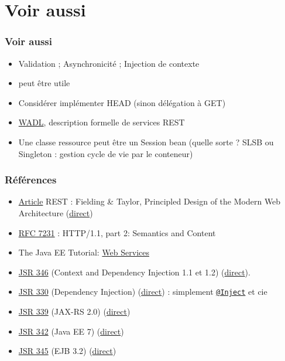 \documentclass[english, french]{beamer}
\begin{document}
\section{Voir aussi}
\begin{frame}
	\frametitle{Voir aussi}
	\begin{itemize}
		\item Validation ; Asynchronicité ; Injection de contexte%
		\item {} peut être utile
		\item Considérer implémenter HEAD (sinon délégation à GET)
		\item \href{http://www.w3.org/Submission/wadl/}{WADL}, description formelle de services REST
		\item Une classe ressource peut être un Session bean (quelle sorte ? \pause SLSB ou Singleton : gestion cycle de vie par le conteneur)
	\end{itemize}
\end{frame}

\begin{frame}
	\frametitle{Références}
	\begin{itemize}
		\item \href{http://doi.org/10.1145/337180.337228}{Article} REST : Fielding \& Taylor, Principled Design of the Modern Web Architecture (\href{https://www.ics.uci.edu/~fielding/pubs/webarch_icse2000.pdf}{direct})%
		\item \href{http://www.w3.org/Protocols/}{RFC 7231} : HTTP/1.1, part 2: Semantics and Content
		\item The Java EE Tutorial: \href{http://docs.oracle.com/javaee/7/tutorial/partwebsvcs.htm}{Web Services}
		\item \href{https://jcp.org/en/jsr/detail?id=346}{JSR 346} (Context and Dependency Injection 1.1 et 1.2) (\href{http://download.oracle.com/otn-pub/jcp/cdi-1_2-mrel-eval-spec/cdi-1.2.pdf}{direct}).
		\item \href{https://jcp.org/en/jsr/detail?id=330}{JSR 330} (Dependency Injection) (\href{http://download.oracle.com/otn-pub/jcp/dependency_injection-1.0-final-oth-JSpec/dependency_injection-1_0-final-spec.zip}{direct}) : simplement \href{http://docs.oracle.com/javaee/7/api/javax/inject/Inject.html}{\texttt{@Inject}} et cie
		\item \href{https://jcp.org/en/jsr/detail?id=339}{JSR 339} (JAX-RS 2.0) (\href{http://download.oracle.com/otn-pub/jcp/jaxrs-2_0_rev_A-mrel-eval-spec/jsr339-jaxrs-2.0-final-spec.pdf}{direct})
		\item \href{https://jcp.org/en/jsr/detail?id=342}{JSR 342} (Java EE 7) (\href{http://download.oracle.com/otn-pub/jcp/java_ee-7-mrel-eval-spec/JavaEE_Platform_Spec.pdf}{direct})
		\item \href{https://jcp.org/en/jsr/detail?id=345}{JSR 345} (EJB 3.2) (\href{http://download.oracle.com/otn-pub/jcp/ejb-3_2-fr-eval-spec/ejb-3_2-core-fr-spec.pdf}{direct})
	\end{itemize}
\end{frame}
\end{document}
